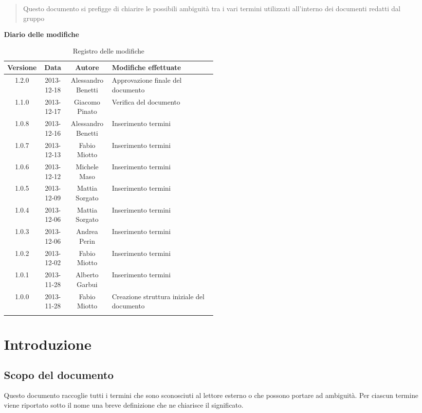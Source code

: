\begin{abstract}
\begin{center}
Questo documento si prefigge di chiarire le possibili ambiguità tra i vari termini utilizzati all'interno dei documenti redatti dal gruppo \NomeGruppo{}
\end{center}
\end{abstract}

\newpage
\textbf{Diario delle modifiche}
\begin{center}
\begin{longtable}{|c|c|c|p{0.5\linewidth}|}
\toprule
\textbf{Versione} & \textbf{Data} & \textbf{Autore} & \textbf{Modifiche effettuate}\\
\midrule
1.2.0 & 2013-12-18 & Alessandro Benetti & Approvazione finale del documento\\
\midrule
1.1.0 & 2013-12-17 & Giacomo Pinato & Verifica del documento \\
\midrule
1.0.8 & 2013-12-16 & Alessandro Benetti & Inserimento termini\\
\midrule
1.0.7 & 2013-12-13 & Fabio Miotto & Inserimento termini\\
\midrule
1.0.6 & 2013-12-12 & Michele Maso & Inserimento termini\\
\midrule
1.0.5 & 2013-12-09 & Mattia Sorgato & Inserimento termini\\
\midrule
1.0.4 & 2013-12-06 & Mattia Sorgato & Inserimento termini \\
\midrule
1.0.3 & 2013-12-06 & Andrea Perin & Inserimento termini\\
\midrule
1.0.2 & 2013-12-02 & Fabio Miotto & Inserimento termini\\
\midrule
1.0.1 & 2013-11-28 & Alberto Garbui & Inserimento termini\\
\midrule
1.0.0 & 2013-11-28 & Fabio Miotto & Creazione struttura iniziale del documento\\


\bottomrule
\caption{Registro delle modifiche}
\label{tab:changelog}
\end{longtable}
\end{center}

\newpage
\section{Introduzione}%
\label{1.0}
\subsection{Scopo del documento}%
\label{1.1}
Questo documento raccoglie tutti i termini che sono sconosciuti al lettore esterno o che possono portare ad ambiguità. Per ciascun termine viene riportato sotto il nome una breve definizione che ne chiarisce il significato.
